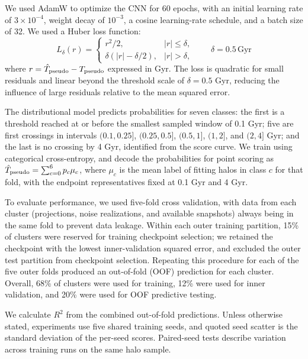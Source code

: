 We used AdamW to optimize the CNN for 60 epochs, with an initial learning rate of $3\times 10^{-4}$, weight decay of $10^{-3}$, a cosine learning-rate schedule, and a batch size of 32.
We used a Huber loss function:
\begin{equation}
    L_\delta(r)
    = \begin{cases}
        r^2/2,& |r| \leq \delta,\\
        \delta(|r| - \delta/2),& |r| > \delta,
    \end{cases}
    \qquad \delta = 0.5\,\text{Gyr}
\end{equation}
where $r = \hat T_{\rm pseudo}-T_{\rm pseudo}$ expressed in Gyr.
The loss is quadratic for small residuals and linear beyond the threshold scale of $\delta = 0.5$ Gyr, reducing the influence of large residuals relative to the mean squared error.

The distributional model predicts probabilities for seven classes: 
the first is a threshold reached at or before the smallest sampled window of 0.1 Gyr; 
five are first crossings in intervals $(0.1,0.25]$, $(0.25,0.5]$, $(0.5,1]$, $(1,2]$, and $(2,4]$ Gyr;
and the last is no crossing by 4 Gyr, identified from the score curve.
We train using categorical cross-entropy, and decode the probabilities for point scoring as $\hat T_{\rm pseudo}=\sum_{c=0}^{6}p_c\mu_c$, where $\mu_c$ is the mean label of fitting halos in class $c$ for that fold, with the endpoint representatives fixed at 0.1 Gyr and 4 Gyr.

To evaluate performance, we used five-fold cross validation, with data from each cluster (projections, noise realizations, and available snapshots) always being in the same fold to prevent data leakage.
Within each outer training partition, 15\% of clusters were reserved for training checkpoint selection; we retained the checkpoint with the lowest inner-validation squared error, and excluded the outer test partition from checkpoint selection.
Repeating this procedure for each of the five outer folds produced an out-of-fold (OOF) prediction for each cluster.
Overall, 68\% of clusters were used for training, 12\% were used for inner validation, and 20\% were used for OOF predictive testing.

We calculate $R^2$ from the combined out-of-fold predictions.
Unless otherwise stated, experiments use five shared training seeds, and quoted seed scatter is the standard deviation of the per-seed scores.
Paired-seed tests describe variation across training runs on the same halo sample.

